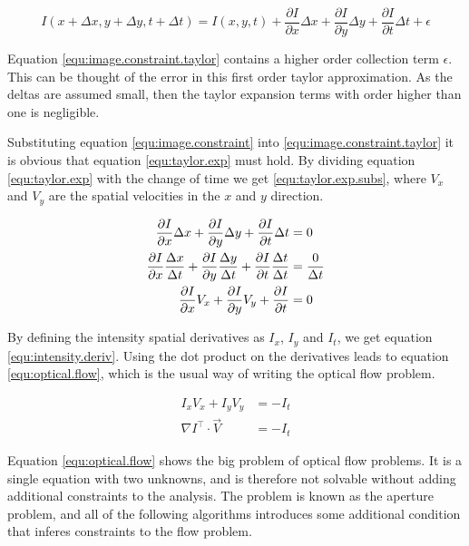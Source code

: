 \begin{equation}
I(x + \Delta x, y+ \Delta y, t + \Delta t) = I(x,y,t) + \frac{\partial I}{\partial x} \Delta x + \frac{\partial I}{\partial y} \Delta y + \frac{\partial I}{\partial t} \Delta t + \epsilon
\label{equ:image.constraint.taylor}
\end{equation}

Equation \eqref{equ:image.constraint.taylor} contains a higher order collection term $\epsilon$. This can be thought of the error in this first order taylor approximation. As
the deltas are assumed small, then the taylor expansion terms with order higher than one is negligible. 

Substituting equation \eqref{equ:image.constraint} into \eqref{equ:image.constraint.taylor} it is obvious that equation \eqref{equ:taylor.exp} must hold. 
By dividing equation \eqref{equ:taylor.exp} with the change of time we get \eqref{equ:taylor.exp.subs}, where $V_x$ and $V_y$ are the spatial velocities in the 
$x$ and $y$ direction.

\begin{align}
\frac{\partial I}{\partial x} \Delta x + \frac{\partial I}{\partial y} \Delta y + \frac{\partial I}{\partial t} \Delta t &= 0 \label{equ:taylor.exp} \\
\frac{\partial I}{\partial x} \frac{\Delta x}{\Delta t} + \frac{\partial I}{\partial y} \frac{\Delta y}{\Delta t} + \frac{\partial I}{\partial t} \frac{\Delta t}{\Delta t} &= \frac{0}{\Delta t} \notag \\
\frac{\partial I}{\partial x} V_x + \frac{\partial I}{\partial y} V_y + \frac{\partial I}{\partial t}  &= 0 \label{equ:taylor.exp.subs}
\end{align}

By defining the intensity spatial derivatives as $I_x$, $I_y$ and $I_t$, we get equation \eqref{equ:intensity.deriv}. Using the dot product on the derivatives 
leads to equation \eqref{equ:optical.flow}, which is the usual way of writing the optical flow problem.

\begin{align}
I_x V_x + I_y V_y &= -I_t \label{equ:intensity.deriv} \\
\nabla I^\top \cdot \vec{V} &= -I_t \label{equ:optical.flow}
\end{align}

Equation \eqref{equ:optical.flow} shows the big problem of optical flow problems. It is a single equation with two unknowns, and is therefore not 
solvable without adding additional constraints to the analysis. The problem is known as the aperture problem, and all of the following algorithms 
introduces some additional condition that inferes constraints to the flow problem.

